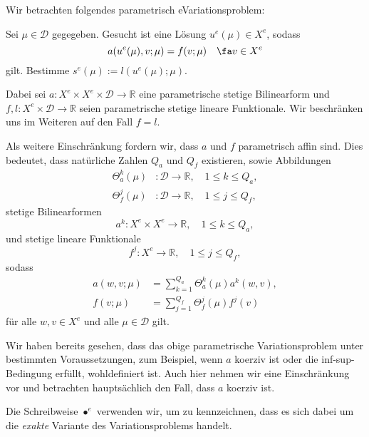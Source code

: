 Wir betrachten folgendes parametrisch eVariationsproblem:
\begin{addmargin}[2em]{2em}
    Sei $\mu \in \mathcal D$ gegegeben. Gesucht ist eine Lösung $u^e(\mu) \in X^e$, sodass
    \begin{equation}
        a(u^e(\mu), v; \mu) = f(v; \mu) \quad \fa v \in X^e
    \end{equation}
    gilt.
    Bestimme $s^e(\mu) := l(u^e(\mu); \mu)$.
\end{addmargin}
Dabei sei $a \colon X^e \times X^e \times \mathcal D \to \mathbb{R}$ eine parametrische stetige Bilinearform und $f, l \colon X^e \times \mathcal D \to \mathbb{R}$ seien parametrische stetige lineare Funktionale.
Wir beschränken uns im Weiteren auf den Fall $f = l$.

Als weitere Einschränkung fordern wir, dass $a$ und $f$ parametrisch affin sind.
Dies bedeutet, dass natürliche Zahlen $Q_a$ und $Q_f$ existieren, sowie Abbildungen
\begin{align}
    \Theta_a^k(\mu) &\colon \mathcal D \to \mathbb{R}, \quad 1 \leq k \leq Q_a, \\
    \Theta_f^j(\mu) &\colon \mathcal D \to \mathbb{R}, \quad 1 \leq j \leq Q_f,
\end{align}
stetige Bilinearformen
\begin{equation}
    a^k \colon X^e \times X^e \to \mathbb{R}, \quad 1 \leq k \leq Q_a,
\end{equation}
und stetige lineare Funktionale
\begin{equation}
    f^j \colon X^e \to \mathbb{R}, \quad 1 \leq j \leq Q_f,
\end{equation}
sodass
\begin{align*}
    a(w, v; \mu) &= \sum_{k=1}^{Q_a} \Theta_a^k(\mu) a^k(w, v), \\
    f(v; \mu)    &= \sum_{j=1}^{Q_f} \Theta_f^j(\mu) f^j(v)
\end{align*}
für alle $w, v \in X^e$ und alle $\mu \in \mathcal D$ gilt.


Wir haben bereits gesehen, dass das obige parametrische Variationsproblem unter bestimmten Voraussetzungen, zum Beispiel, wenn $a$ koerziv ist oder die inf-sup-Bedingung erfüllt, wohldefiniert ist.
Auch hier nehmen wir eine Einschränkung vor und betrachten hauptsächlich den Fall, dass $a$ koerziv ist.

Die Schreibweise $\bullet^e$ verwenden wir, um zu kennzeichnen, dass es sich dabei um die \emph{exakte} Variante des Variationsproblems handelt.


